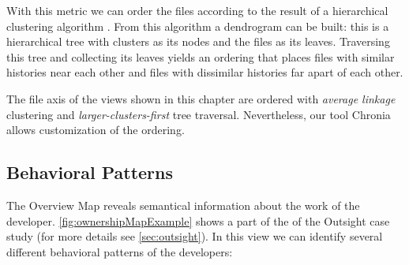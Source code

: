With this metric we can order the files according to the result of a hierarchical clustering algorithm \cite{Jain99a}. From this algorithm a dendrogram can be built: this is a hierarchical tree with clusters as its nodes and the files as its leaves. Traversing this tree and collecting its leaves yields an ordering that places files with similar histories near each other and files with dissimilar histories far apart of each other.

The file axis of the \omap views shown in this chapter are ordered with \textit{average linkage} clustering and \textit{larger-clusters-first} tree traversal. Nevertheless, our tool Chronia allows customization of the ordering.

\subsection{Behavioral Patterns}

The Overview Map reveals semantical information about the work of the developer. \autoref{fig:ownershipMapExample} shows a part of the \omap of the Outsight case study (for more details see \autoref{sec:outsight}). In this view we can identify several different behavioral patterns of the developers:


